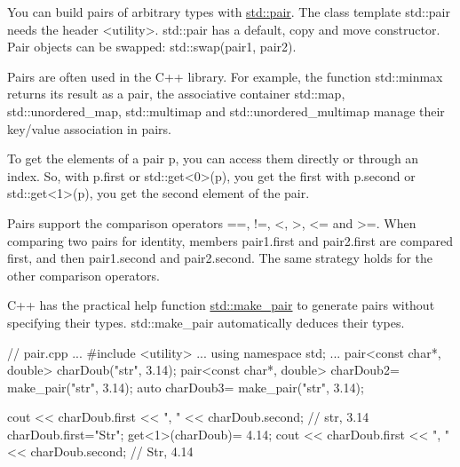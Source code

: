 You can build pairs of arbitrary types with \href{http://en.cppreference.com/w/cpp/utility/pair}{std::pair}. The class template std::pair needs the header <utility>. std::pair has a default, copy and move constructor. Pair objects can be swapped: std::swap(pair1, pair2).

Pairs are often used in the C++ library. For example, the function std::minmax returns its result as a pair, the associative container std::map, std::unordered\_map, std::multimap and std::unordered\_multimap manage their key/value association in pairs.

To get the elements of a pair p, you can access them directly or through an index. So, with p.first or std::get<0>(p), you get the first with p.second or std::get<1>(p), you get the second element of the pair.

Pairs support the comparison operators ==, !=, <, >, <= and >=. When comparing two pairs for identity, members pair1.first and pair2.first are compared first, and then pair1.second and pair2.second. The same strategy holds for the other comparison operators.


C++ has the practical help function \href{http://en.cppreference.com/w/cpp/utility/pair/make_pair}{std::make\_pair} to generate pairs without specifying their types. std::make\_pair automatically deduces their types.


\begin{cpp}
// pair.cpp
...
#include <utility>
...
using namespace std;
...
pair<const char*, double> charDoub("str", 3.14);
pair<const char*, double> charDoub2= make_pair("str", 3.14);
auto charDoub3= make_pair("str", 3.14);

cout << charDoub.first << ", " << charDoub.second; // str, 3.14
charDoub.first="Str";
get<1>(charDoub)= 4.14;
cout << charDoub.first << ", " << charDoub.second; // Str, 4.14
\end{cpp}
































